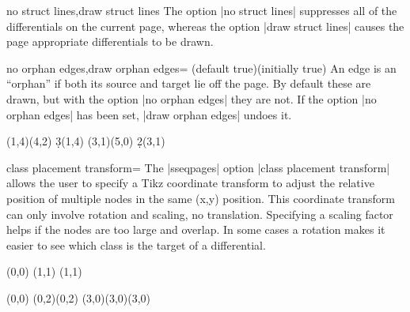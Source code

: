 \documentclass{ltxdoc}
\begin{document}
\begin{sseqdata}[name=ex1,degree={#1}{1-#1}]
\begin{keylist}{no struct lines,draw struct lines}
The option |no struct lines| suppresses all of the differentials on the current page, whereas the option |draw struct lines| causes the page appropriate differentials to be drawn.
\end{keylist}

\begin{keylist}{no orphan edges,draw orphan edges= (default true)(initially true)}
An edge is an ``orphan'' if both its source and target lie off the page. By default these are drawn, but with the option |no orphan edges| they are not. If the option |no orphan edges| has been set, |draw orphan edges| undoes it.
\begin{codeexample}[]
\begin{sseqdata}[name=orphan edges example,cohomological Serre grading,
                x range={0}{3}, y range={0}{3}]
\class(1,4)\class(4,2)
\d3(1,4)
\class(3,1)\class(5,0)
\d2(3,1)
\end{sseqdata}
\printpage[name=orphan edges example]
\hskip1cm
\printpage[name=orphan edges example,no orphan edges]
\end{codeexample}
\end{keylist}


\begin{key}{class placement transform=}
The |sseqpages| option |class placement transform| allows the user to specify a Tikz coordinate transform to adjust the relative position of multiple nodes in the same (x,y) position. This coordinate transform can only involve rotation and scaling, no translation. Specifying a scaling factor helps if the nodes are too large and overlap. In some cases a rotation makes it easier to see which class is the target of a differential.
\begin{codeexample}[width=5cm]
\begin{sseqpage}[classes={draw=none},class placement transform={xscale=3},
                 xscale=2, x axis extend end=0.7cm]
\class["\mathbb{Z}"](0,0)
\class["\mathbb{Z}/2"](1,1)
\class["\mathbb{Z}/3"](1,1)
\end{sseqpage}
\end{codeexample}
\begin{codeexample}[width=5cm]
\begin{sseqpage}[classes=fill,class placement transform={rotate=40},
                 cohomological Serre grading,differentials=blue,scale=0.7]
\class(0,0)
\class(0,2)\class(0,2)
\class[red](3,0)\class[green](3,0)\class[blue](3,0)


\end{sseqpage}
\end{codeexample}
\end{key}
\end{sseqdata}
\end{document}
